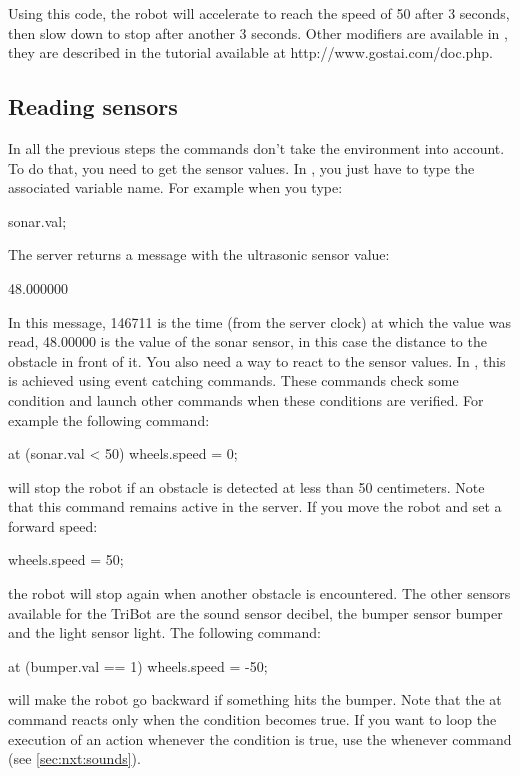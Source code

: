 Using this code, the robot will accelerate to reach the speed of 50 after 3
seconds, then slow down to stop after another 3 seconds.
Other modifiers are available in \urbi, they are described in the \urbi tutorial
available at http://www.gostai.com/doc.php.

\subsection{Reading sensors}
In all the previous steps the commands don't take the environment into account.
To do that, you need to get the sensor values. In \urbi, you just have to type
the associated variable name. For example when you type:
\begin{urbiunchecked}
  sonar.val;
\end{urbiunchecked}

The server returns a message with the ultrasonic sensor value:
\begin{urbiunchecked}
  [146711] 48.000000
\end{urbiunchecked}

In this message, 146711 is the time (from the server clock) at which the value
was read, 48.00000 is the value of the sonar sensor, in this case the distance
to the obstacle in front of it.
You also need a way to react to the sensor values. In \urbi, this is achieved
using event catching commands. These commands check some condition and launch
other commands when these conditions are verified. For example the following
command:
\begin{urbiunchecked}
  at (sonar.val < 50) wheels.speed = 0;
\end{urbiunchecked}

will stop the robot if an obstacle is detected at less than 50 centimeters.
Note that this command remains active in the server. If you move the robot and
set a forward speed:
\begin{urbiunchecked}
  wheels.speed = 50;
\end{urbiunchecked}

the robot will stop again when another obstacle is encountered.
The other sensors available for the TriBot are the sound sensor decibel, the
bumper sensor bumper and the light sensor light. The following command:
\begin{urbiunchecked}
  at (bumper.val == 1) wheels.speed = -50;
\end{urbiunchecked}

will make the robot go backward if something hits the bumper.
Note that the at command reacts only when the condition becomes true. If you
want to loop the execution of an action whenever the condition is true, use the
whenever command (see \autoref{sec:nxt:sounds}).


